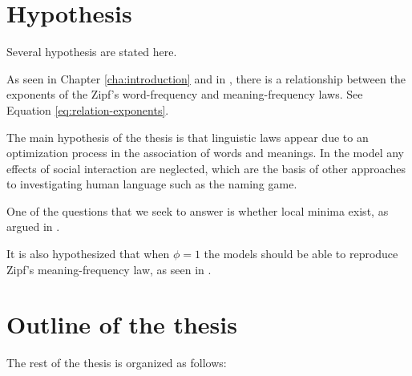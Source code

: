 \section{Hypothesis}
\label{sec:introduction_hypothesis}

Several hypothesis are stated here.

As seen in Chapter \ref{cha:introduction} and in \cite{Ferrer2018a}, there is a relationship between the exponents of the Zipf's word-frequency and meaning-frequency laws.
See Equation \eqref{eq:relation-exponents}.

The main hypothesis of the thesis is that linguistic laws appear due to an optimization process in the association of words and meanings.
In the model any effects of social interaction are neglected, which are the basis of other approaches to investigating human language such as the naming game. \cite{Baronchelli2006}

One of the questions that we seek to answer is whether local minima exist, as argued in \cite{Ferrer2017a}.

It is also hypothesized that when $\phi=1$ the models should be able to reproduce Zipf's meaning-frequency law, as seen in \cite{Ferrer2018a}.


\section{Outline of the thesis}
\label{sec:introduction_outline}

The rest of the thesis is organized as follows:

